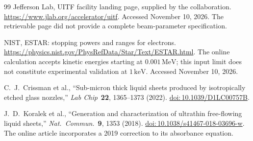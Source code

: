 \documentclass[11pt,letterpaper]{article}
\newcommand{\keV}{\,\mathrm{keV}}
\newcommand{\MeV}{\,\mathrm{MeV}}
\newcommand{\doi}[1]{\href{https://doi.org/#1}{doi:\,#1}}
\begin{document}
\begin{thebibliography}{99}
Jefferson Lab, UITF facility landing page, supplied by the collaboration.
\url{https://www.jlab.org/accelerator/uitf}. Accessed November 10, 2026.
The retrievable page did not provide a complete beam-parameter specification.

NIST, ESTAR: stopping powers and ranges for electrons.
\url{https://physics.nist.gov/PhysRefData/Star/Text/ESTAR.html}.
The online calculation accepts kinetic energies starting at $0.001\MeV$; this input limit does not
constitute experimental validation at $1\keV$. Accessed November 10, 2026.

C.\ J.\ Crissman et al., ``Sub-micron thick liquid sheets produced by isotropically etched glass
nozzles,'' \emph{Lab Chip}\ \textbf{22}, 1365--1373 (2022). \doi{10.1039/D1LC00757B}.

J.\ D.\ Koralek et al., ``Generation and characterization of ultrathin free-flowing liquid sheets,''
\emph{Nat.\ Commun.}\ \textbf{9}, 1353 (2018). \doi{10.1038/s41467-018-03696-w}.
The online article incorporates a 2019 correction to its absorbance equation.

\end{thebibliography}
\end{document}
